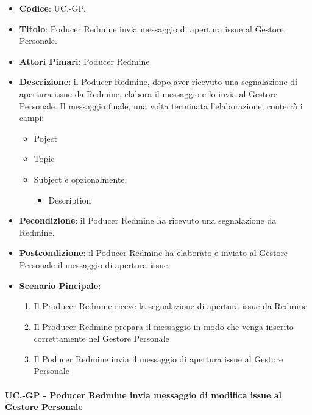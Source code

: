 	\begin{itemize}
		\item \textbf{Codice}: UC\theuccount.\thesubuccount-GP.
		\item \textbf{Titolo}: Poducer Redmine invia messaggio di apertura issue al Gestore Personale.
		\item \textbf{Attori Pimari}: Poducer Redmine.
		\item \textbf{Descrizione}: il Poducer Redmine, dopo aver
		ricevuto una segnalazione di apertura issue da Redmine, elabora il messaggio e lo invia al Gestore Personale.
		Il messaggio finale, una volta terminata l'elaborazione, conterrà i campi:
		\begin{itemize}
			\item Poject
			\item Topic
			\item Subject e opzionalmente:
			\begin{itemize}
				\item Description
			\end{itemize}
		\end{itemize}
		\item \textbf{Pecondizione}: il Poducer Redmine ha ricevuto una segnalazione da Redmine.
		\item \textbf{Postcondizione}: il Poducer Redmine ha elaborato e inviato al Gestore Personale il messaggio di apertura issue.
		\item \textbf{Scenario Pincipale}: 
		\begin{enumerate}
			\item Il Producer Redmine riceve la segnalazione di apertura issue da Redmine
			\item Il Producer Redmine prepara il messaggio in modo che venga inserito correttamente nel Gestore Personale
			\item Il Poducer Redmine invia il messaggio di
			apertura issue al Gestore Personale
		\end{enumerate}
		
	\end{itemize}
	
	\paragraph{UC\theuccount.\thesubuccount-GP - Poducer Redmine invia messaggio di modifica issue al Gestore Personale}
		
